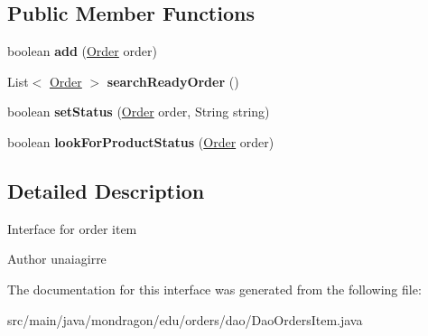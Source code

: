 \subsection*{Public Member Functions}
\begin{DoxyCompactItemize}
\item 
\mbox{\label{interfacemondragon_1_1edu_1_1orders_1_1dao_1_1_dao_orders_item_a8d0f03c081074768eca5611e5eaf4c0d}} 
boolean {\bfseries add} (\mbox{\hyperlink{classmondragon_1_1edu_1_1clases_1_1_order}{Order}} order)
\item 
\mbox{\label{interfacemondragon_1_1edu_1_1orders_1_1dao_1_1_dao_orders_item_a932a2224ea61c9e26a8764407cc45b15}} 
List$<$ \mbox{\hyperlink{classmondragon_1_1edu_1_1clases_1_1_order}{Order}} $>$ {\bfseries search\+Ready\+Order} ()
\item 
\mbox{\label{interfacemondragon_1_1edu_1_1orders_1_1dao_1_1_dao_orders_item_af6769d5f3acf588fe976193db1cdf3bc}} 
boolean {\bfseries set\+Status} (\mbox{\hyperlink{classmondragon_1_1edu_1_1clases_1_1_order}{Order}} order, String string)
\item 
\mbox{\label{interfacemondragon_1_1edu_1_1orders_1_1dao_1_1_dao_orders_item_a1aef6703d03694424f93ecfc405e0fc7}} 
boolean {\bfseries look\+For\+Product\+Status} (\mbox{\hyperlink{classmondragon_1_1edu_1_1clases_1_1_order}{Order}} order)
\end{DoxyCompactItemize}


\subsection{Detailed Description}
Interface for order item

\begin{DoxyAuthor}{Author}
unaiagirre 
\end{DoxyAuthor}


The documentation for this interface was generated from the following file\+:\begin{DoxyCompactItemize}
\item 
src/main/java/mondragon/edu/orders/dao/Dao\+Orders\+Item.\+java\end{DoxyCompactItemize}
